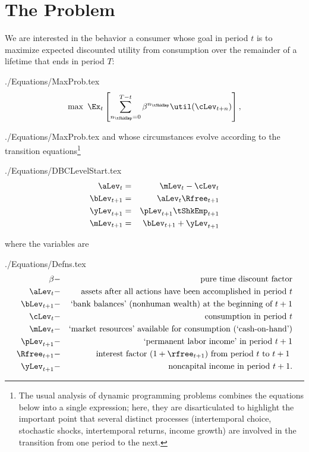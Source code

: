 \documentclass[titlepage]{\econtex}
\begin{document}
\section{The Problem}\label{sec:basicproblem}
We are interested in the behavior a consumer whose goal in period $t$ is to
maximize expected discounted utility from consumption over the remainder of a
lifetime that ends in period $T$:
\begin{verbatimwrite}{./Equations/MaxProb.tex}
\begin{equation}\label{eq:MaxProb}
\max ~ \Ex_{t}\left[ \sum_{n_{\tShkEmp}=0}^{T-t} {\DiscAlt}^{n_{\tShkEmp}} \util({\cLev}_{t+n})\right],
\end{equation}
\end{verbatimwrite}
 {./Equations/MaxProb.tex}
and whose circumstances evolve according to the transition equations\footnote{The usual analysis of dynamic programming problems combines the equations below into a single expression; here, they are disarticulated to highlight the important point that several distinct processes (intertemporal choice, stochastic shocks, intertemporal returns, income growth) are involved in the transition from one period to the next.}
\begin{verbatimwrite}{./Equations/DBCLevelStart.tex}
\begin{eqnarray}
    {\aLev}_{t} & = & \mLev_{t}-\cLev_{t} \label{DBCLevelStart}
\\  {\bLev}_{t+1} & = & {\aLev}_{t} \Rfree_{t+1}
\\  {\yLev}_{t+1} & = & \pLev_{t+1}\tShkEmp_{t+1}
\\  {\mLev}_{t+1} & = & {\bLev}_{t+1} + {\yLev}_{t+1} \label{eq:budconstr} \label{DBCLevelEnd}
\end{eqnarray}
\end{verbatimwrite}

where the variables are
\begin{verbatimwrite}{./Equations/Defns.tex}
\begin{eqnarray*}
{\DiscAlt} & - & \text{pure time discount factor} \\
{\aLev}_{t} & - & \text{assets after all actions have been accomplished in period $t$} \\
{\bLev}_{t+1} & - & \text{`bank balances' (nonhuman wealth) at the beginning of $t+1$} \\
{\cLev}_{t} & - & \text{consumption in period $t$} \\
{\mLev}_{t} & - & \text{`market resources' available for consumption (`cash-on-hand')} \\
\pLev_{t+1} & - & \text{`permanent labor income' in period $t+1$} \\
\Rfree_{t+1} & - & \text{interest factor $(1+\rfree_{t+1})$ from period $t$ to $t+1$ } \\
{\yLev}_{t+1} & - & \text{noncapital income in period $t+1$}.
\end{eqnarray*}
\end{verbatimwrite}

\end{document}

